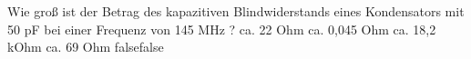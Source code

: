     {Wie groß ist der Betrag des kapazitiven Blindwiderstands eines Kondensators mit 50 pF bei einer Frequenz von 145 MHz ?}
    {ca. 22 Ohm}
    {ca. 0,045 Ohm}
    {ca. 18,2 kOhm}
    {ca. 69 Ohm}
    {false}{false}